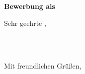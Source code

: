 \documentclass[12pt,a4paper,oneside]{letter}
\date{}
\begin{document}
\begin{letter}{\firmName \\ \firmResponsible \\ \firmRespJob \\ \firmAddress \\[2\baselineskip] \hspace{99mm} \dateAndPlace \\[2\baselineskip] \textbf{Bewerbung als \subjekt}}

\opening{Sehr geehrte \firmResponsible,}
    

\einleitung


\haupteileins
\\
\\
\haupteilzwei

\schluss

Mit freundlichen Grüßen, 
\\[\baselineskip]
\myname
\end{letter}
\end{document}
